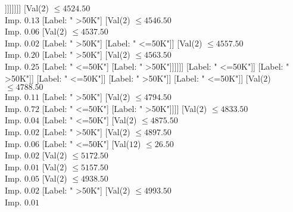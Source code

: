 \documentclass[margin=10pt]{standalone}
\begin{document}
\begin{forest}
																																						[Label: " <=50K"]
																																						[Label: " >50K"]]]]]]]]
																															[Val($2$) $ \leq 4524.50$ \\ Imp. $0.13$
																																[Label: " >50K"]
																																[Val($2$) $ \leq 4546.50$ \\ Imp. $0.06$
																																	[Val($2$) $ \leq 4537.50$ \\ Imp. $0.02$
																																		[Label: " >50K"]
																																		[Label: " <=50K"]]
																																	[Val($2$) $ \leq 4557.50$ \\ Imp. $0.20$
																																		[Label: " >50K"]
																																		[Val($2$) $ \leq 4563.50$ \\ Imp. $0.25$
																																			[Label: " <=50K"]
																																			[Label: " >50K"]]]]]]
																														[Label: " <=50K"]]
																													[Label: " >50K"]]
																												[Label: " <=50K"]]
																											[Label: " >50K"]]
																										[Label: " <=50K"]]
																									[Val($2$) $ \leq 4788.50$ \\ Imp. $0.11$
																										[Label: " >50K"]
																										[Val($2$) $ \leq 4794.50$ \\ Imp. $0.72$
																											[Label: " <=50K"]
																											[Label: " >50K"]]]]
																								[Val($2$) $ \leq 4833.50$ \\ Imp. $0.04$
																									[Label: " <=50K"]
																									[Val($2$) $ \leq 4875.50$ \\ Imp. $0.02$
																										[Label: " >50K"]
																										[Val($2$) $ \leq 4897.50$ \\ Imp. $0.06$
																											[Label: " <=50K"]
																											[Val($12$) $ \leq 26.50$ \\ Imp. $0.02$
																												[Val($2$) $ \leq 5172.50$ \\ Imp. $0.01$
																													[Val($2$) $ \leq 5157.50$ \\ Imp. $0.05$
																														[Val($2$) $ \leq 4938.50$ \\ Imp. $0.02$
																															[Label: " >50K"]
																															[Val($2$) $ \leq 4993.50$ \\ Imp. $0.01$

\end{forest}
\end{document}
